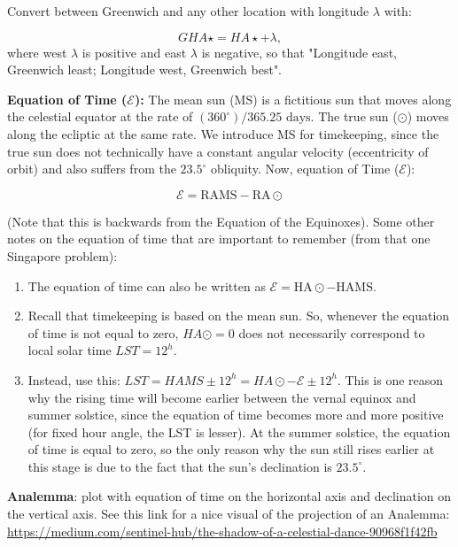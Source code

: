 \documentclass[12pt]{article}
\newcommand{\V}{

\vspace{\baselineskip}

}
\begin{document}
Convert between Greenwich and any other location with longitude $\lambda$ with: 

\begin{equation*}
    GHA\star = HA\star + \lambda,
\end{equation*}
where west $\lambda$ is positive and east $\lambda$ is negative, so that "Longitude east, Greenwich least; Longitude west, Greenwich best".\V

\textbf{Equation of Time ($\mathcal{E}$):} The mean sun (MS) is a fictitious sun that moves along the celestial equator at the rate of $(360^{\circ})/365.25\text{ days}$. The true sun ($\odot$) moves along the ecliptic at the same rate. We introduce MS for timekeeping, since the true sun does not technically have a constant angular velocity (eccentricity of orbit) and also suffers from the $23.5^{\circ}$ obliquity. Now, equation of Time ($\mathcal{E}$):

\[\mathcal{E} = \text{RAMS} - \text{RA}\odot\]

(Note that this is backwards from the Equation of the Equinoxes). Some other notes on the equation of time that are important to remember (from that one Singapore problem): 
\begin{enumerate}
    \item The equation of time can also be written as $\mathcal{E} = \text{HA}\odot - \text{HAMS}$. 
    \item Recall that timekeeping is based on the mean sun. So, whenever the equation of time is not equal to zero, $HA\odot = 0$ does not necessarily correspond to local solar time $LST = 12^{h}$.
    \item Instead, use this: $LST = HAMS \pm 12^{h} = HA\odot - \mathcal{E} \pm 12^{h}$. This is one reason why the rising time will become earlier between the vernal equinox and summer solstice, since the equation of time becomes more and more positive (for fixed hour angle, the LST is lesser). At the summer solstice, the equation of time is equal to zero, so the only reason why the sun still rises earlier at this stage is due to the fact that the sun's declination is $23.5^{\circ}$.
\end{enumerate}


\V




\textbf{Analemma}: plot with equation of time on the horizontal axis and declination on the vertical axis. See this link for a nice visual of the projection of an Analemma: \href{https://medium.com/sentinel-hub/the-shadow-of-a-celestial-dance-90968f1f42fb}{https://medium.com/sentinel-hub/the-shadow-of-a-celestial-dance-90968f1f42fb}\V
\end{document}
